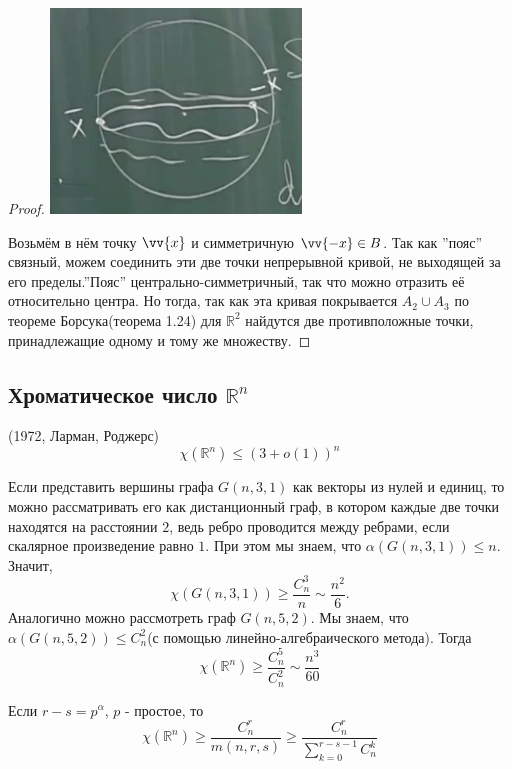 \begin{proof}
\includegraphics[width=0.5\textwidth]{images/lecture15_sphere4.png}

Возьмём в нём точку $\vv{x}$ и симметричную $\vv{-x} \in B$. Так как ''пояс'' связный, можем соединить эти две точки непрерывной кривой, не выходящей за его пределы.''Пояс'' центрально-симметричный, так что можно отразить её относительно центра. Но тогда, так как эта кривая покрывается $A_2 \cup A_3$ по теореме Борсука(теорема 1.24) для $\mathbb{R}^2$ найдутся две противположные точки, принадлежащие одному и тому же множеству.  

\end{proof}



\subsection{Хроматическое число $\mathbb{R}^n$}

\begin{theorem}(1972, Ларман, Роджерс)
\[
\chi(\mathbb{R}^n) \le (3+o(1))^n
\]

\end{theorem}

Если представить вершины графа $G(n,3,1)$ как векторы из нулей и единиц, то можно рассматривать его как дистанционный граф, в котором каждые две точки находятся на расстоянии $2$, ведь ребро проводится между ребрами, если скалярное произведение равно $1$. При этом мы знаем, что $\alpha(G(n,3,1)) \le n$.
Значит, \[
\chi(G(n,3,1)) \ge \frac{C_n^3}{n} \sim \frac{n^2}{6}.
\]
Аналогично можно рассмотреть граф $G(n,5,2)$. Мы знаем, что $\alpha(G(n,5,2)) \le C_n^2$(с помощью линейно-алгебраического метода). Тогда \[
\chi(\mathbb{R}^n) \ge \frac{C_n^5}{C_n^2} \sim \frac{n^3}{60}
\]

\begin{theorem}
Если $r - s = p^{\alpha}$, $p$ - простое, то \[\chi(\mathbb{R}^n) \ge \frac{C_n^r}{m(n,r,s)} \ge \frac{C_n^r}{\sum_{k = 0}^{r-s-1} C_n^k}\]

\end{theorem}